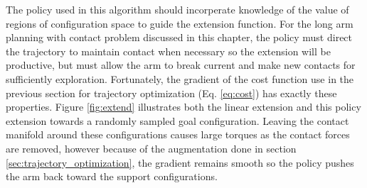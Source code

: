 \documentclass[../thesis.tex]{subfiles}
\begin{document}
The policy used in this algorithm should incorperate knowledge of the value of regions of configuration space to guide the extension function.
For the long arm planning with contact problem discussed in this chapter, the policy must direct the trajectory to maintain contact when necessary so the extension will be productive, but must allow the arm to break current and make new contacts for sufficiently exploration.
Fortunately, the gradient of the cost function use in the previous section for trajectory optimization (Eq. \ref{eq:cost}) has exactly these properties.
Figure \ref{fig:extend} illustrates both the linear extension and this policy extension towards a randomly sampled goal configuration.
Leaving the contact manifold around these configurations causes large torques as the contact forces are removed, however because of the augmentation done in section \ref{sec:trajectory_optimization}, the gradient remains smooth so the policy pushes the arm back toward the support configurations.
\end{document}
